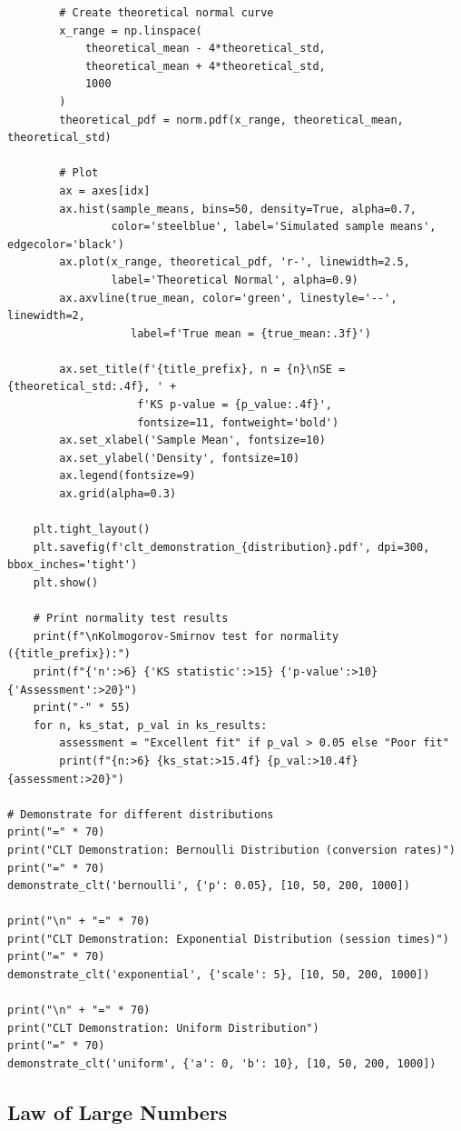 \begin{lstlisting}
        # Create theoretical normal curve
        x_range = np.linspace(
            theoretical_mean - 4*theoretical_std,
            theoretical_mean + 4*theoretical_std,
            1000
        )
        theoretical_pdf = norm.pdf(x_range, theoretical_mean, theoretical_std)

        # Plot
        ax = axes[idx]
        ax.hist(sample_means, bins=50, density=True, alpha=0.7,
                color='steelblue', label='Simulated sample means', edgecolor='black')
        ax.plot(x_range, theoretical_pdf, 'r-', linewidth=2.5,
                label='Theoretical Normal', alpha=0.9)
        ax.axvline(true_mean, color='green', linestyle='--', linewidth=2,
                   label=f'True mean = {true_mean:.3f}')

        ax.set_title(f'{title_prefix}, n = {n}\nSE = {theoretical_std:.4f}, ' +
                    f'KS p-value = {p_value:.4f}',
                    fontsize=11, fontweight='bold')
        ax.set_xlabel('Sample Mean', fontsize=10)
        ax.set_ylabel('Density', fontsize=10)
        ax.legend(fontsize=9)
        ax.grid(alpha=0.3)

    plt.tight_layout()
    plt.savefig(f'clt_demonstration_{distribution}.pdf', dpi=300, bbox_inches='tight')
    plt.show()

    # Print normality test results
    print(f"\nKolmogorov-Smirnov test for normality ({title_prefix}):")
    print(f"{'n':>6} {'KS statistic':>15} {'p-value':>10} {'Assessment':>20}")
    print("-" * 55)
    for n, ks_stat, p_val in ks_results:
        assessment = "Excellent fit" if p_val > 0.05 else "Poor fit"
        print(f"{n:>6} {ks_stat:>15.4f} {p_val:>10.4f} {assessment:>20}")

# Demonstrate for different distributions
print("=" * 70)
print("CLT Demonstration: Bernoulli Distribution (conversion rates)")
print("=" * 70)
demonstrate_clt('bernoulli', {'p': 0.05}, [10, 50, 200, 1000])

print("\n" + "=" * 70)
print("CLT Demonstration: Exponential Distribution (session times)")
print("=" * 70)
demonstrate_clt('exponential', {'scale': 5}, [10, 50, 200, 1000])

print("\n" + "=" * 70)
print("CLT Demonstration: Uniform Distribution")
print("=" * 70)
demonstrate_clt('uniform', {'a': 0, 'b': 10}, [10, 50, 200, 1000])
\end{lstlisting}

\subsection{Law of Large Numbers}

